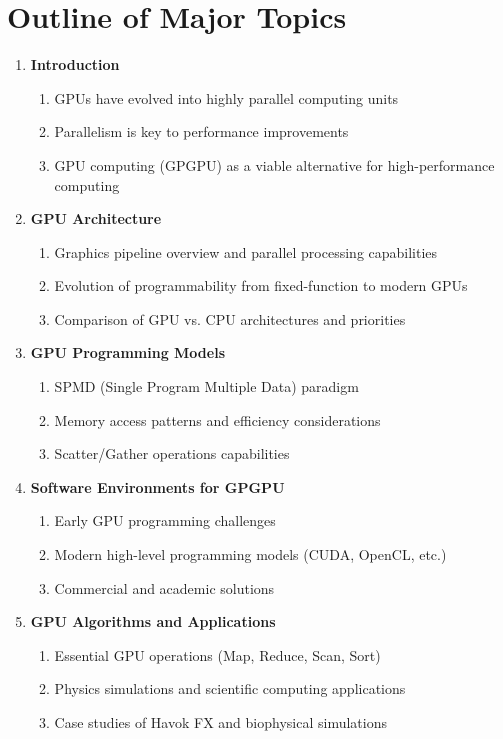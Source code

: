 \documentclass[12pt]{article}
\begin{document}
\section{Outline of Major Topics}
\begin{enumerate}[noitemsep]
    \item \textbf{Introduction}
    \begin{enumerate}[noitemsep]
        \item GPUs have evolved into highly parallel computing units
        \item Parallelism is key to performance improvements
        \item GPU computing (GPGPU) as a viable alternative for high-performance computing
    \end{enumerate}
    
    \item \textbf{GPU Architecture}
    \begin{enumerate}[noitemsep]
        \item Graphics pipeline overview and parallel processing capabilities
        \item Evolution of programmability from fixed-function to modern GPUs
        \item Comparison of GPU vs. CPU architectures and priorities
    \end{enumerate}
    
    \item \textbf{GPU Programming Models}
    \begin{enumerate}[noitemsep]
        \item SPMD (Single Program Multiple Data) paradigm
        \item Memory access patterns and efficiency considerations
        \item Scatter/Gather operations capabilities
    \end{enumerate}
    
    \item \textbf{Software Environments for GPGPU}
    \begin{enumerate}[noitemsep]
        \item Early GPU programming challenges
        \item Modern high-level programming models (CUDA, OpenCL, etc.)
        \item Commercial and academic solutions
    \end{enumerate}
    
    \item \textbf{GPU Algorithms and Applications}
    \begin{enumerate}[noitemsep]
        \item Essential GPU operations (Map, Reduce, Scan, Sort)
        \item Physics simulations and scientific computing applications
        \item Case studies of Havok FX and biophysical simulations
    \end{enumerate}
\end{enumerate}
\end{document}
